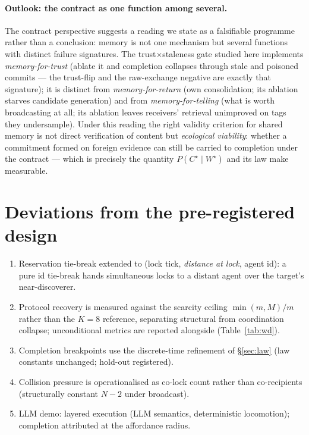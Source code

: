 \documentclass{article}
\newcommand{\wstar}{W^{\star}}
\newcommand{\cstar}{C^{\star}}
\begin{document}
\paragraph{Outlook: the contract as one function among several.}
The contract perspective suggests a reading we state as a
falsifiable programme rather than a conclusion: memory is not one
mechanism but several functions with distinct failure signatures.
The trust$\times$staleness gate studied here implements
\emph{memory-for-trust} (ablate it and completion collapses through
stale and poisoned commits --- the trust-flip and the raw-exchange
negative are exactly that signature); it is distinct from
\emph{memory-for-return} (own consolidation; its ablation starves
candidate generation) and from \emph{memory-for-telling} (what is
worth broadcasting at all; its ablation leaves receivers'
retrieval unimproved on tags they undersample). Under this reading
the right validity criterion for shared memory is not direct
verification of content but \emph{ecological viability}: whether a
commitment formed on foreign evidence can still be carried to
completion under the contract --- which is precisely the quantity
$P(\cstar \mid \wstar)$ and its law make measurable.

\appendix

\section{Deviations from the pre-registered design}
\label{app:deviations}
\begin{enumerate}[leftmargin=20pt,itemsep=2pt,topsep=2pt]
\item Reservation tie-break extended to (lock tick, \emph{distance at
  lock}, agent id): a pure id tie-break hands simultaneous locks to a
  distant agent over the target's near-discoverer.
\item Protocol recovery is measured against the scarcity ceiling
  $\min(m,M)/m$ rather than the $K{=}8$ reference, separating
  structural from coordination collapse; unconditional metrics are
  reported alongside (Table~\ref{tab:wd}).
\item Completion breakpoints use the discrete-time refinement of
  \S\ref{sec:law} (law constants unchanged; hold-out registered).
\item Collision pressure is operationalised as co-lock count rather
  than co-recipients (structurally constant $N{-}2$ under broadcast).
\item LLM demo: layered execution (LLM semantics, deterministic
  locomotion); completion attributed at the affordance radius.
\end{enumerate}
\end{document}
